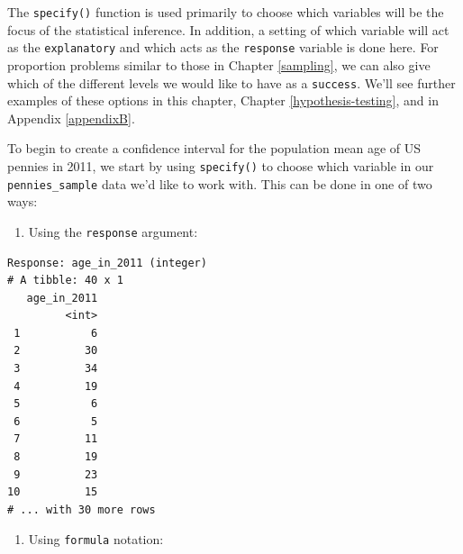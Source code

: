 \documentclass[12pt, krantz2,]{krantz}
\makeatletter
\newenvironment{Shaded}{\begin{snugshade}}{\end{snugshade}}
\newcommand{\DataTypeTok}[1]{\textcolor[rgb]{0.27,0.27,0.27}{#1}}
\newcommand{\DecValTok}[1]{\textcolor[rgb]{0.06,0.06,0.06}{#1}}
\newcommand{\KeywordTok}[1]{\textcolor[rgb]{0.27,0.27,0.27}{\textbf{#1}}}
\newcommand{\NormalTok}[1]{#1}
\newcommand{\OperatorTok}[1]{\textcolor[rgb]{0.43,0.43,0.43}{\textbf{#1}}}
\newcommand{\OtherTok}[1]{\textcolor[rgb]{0.37,0.37,0.37}{#1}}
\newcommand{\StringTok}[1]{\textcolor[rgb]{0.5,0.5,0.5}{#1}}
\providecommand{\tightlist}{%
  \setlength{\itemsep}{0pt}\setlength{\parskip}{0pt}}
\newenvironment{kframe}{%
\medskip{}
\setlength{\fboxsep}{.8em}
 \def\at@end@of@kframe{}%
 \ifinner\ifhmode%
  \def\at@end@of@kframe{\end{minipage}}%
  \begin{minipage}{\columnwidth}%
 \fi\fi%
 \def\FrameCommand##1{\hskip\@totalleftmargin \hskip-\fboxsep
 \colorbox{shadecolor}{##1}\hskip-\fboxsep
     \hskip-\linewidth \hskip-\@totalleftmargin \hskip\columnwidth}%
 \MakeFramed {\advance\hsize-\width
   \@totalleftmargin\z@ \linewidth\hsize
   \@setminipage}}%
 {\par\unskip\endMakeFramed%
 \at@end@of@kframe}
\renewenvironment{Shaded}{\begin{kframe}}{\end{kframe}}
\makeatother
\begin{document}
The \texttt{specify()} function is used primarily to choose which variables will be the focus of the statistical inference. In addition, a setting of which variable will act as the \texttt{explanatory} and which acts as the \texttt{response} variable is done here. For proportion problems similar to those in Chapter \ref{sampling}, we can also give which of the different levels we would like to have as a \texttt{success}. We'll see further examples of these options in this chapter, Chapter \ref{hypothesis-testing}, and in Appendix \ref{appendixB}.

To begin to create a confidence interval for the population mean age of US pennies in 2011, we start by using \texttt{specify()} to choose which variable in our \texttt{pennies\_sample} data we'd like to work with. This can be done in one of two ways:

\begin{enumerate}
\def\labelenumi{\arabic{enumi}.}
\tightlist
\item
  Using the \texttt{response} argument:
\end{enumerate}

\begin{Shaded}
\end{Shaded}

\begin{verbatim}
Response: age_in_2011 (integer)
# A tibble: 40 x 1
   age_in_2011
         <int>
 1           6
 2          30
 3          34
 4          19
 5           6
 6           5
 7          11
 8          19
 9          23
10          15
# ... with 30 more rows
\end{verbatim}

\begin{enumerate}
\def\labelenumi{\arabic{enumi}.}
\setcounter{enumi}{1}
\tightlist
\item
  Using \texttt{formula} notation:
\end{enumerate}

\begin{Shaded}
\end{Shaded}
\end{document}
